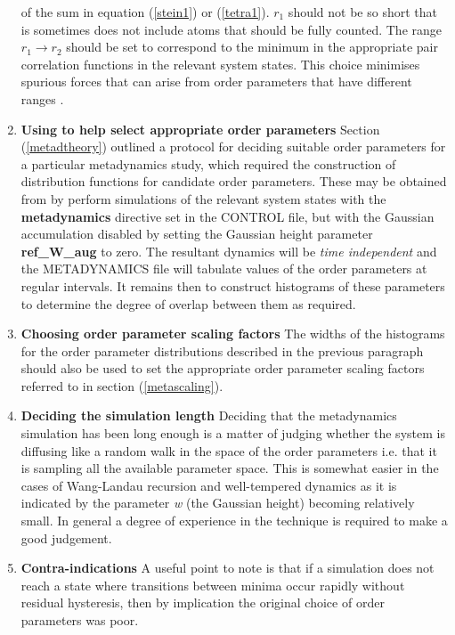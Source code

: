 \begin{enumerate}
  of the sum in equation (\ref{stein1}) or (\ref{tetra1}). $r_{1}$ should not
  be so short that is sometimes does not include atoms that should be fully
  counted. The range $r_{1}\rightarrow r_{2}$ should be set to correspond 
  to the minimum in the appropriate pair correlation functions in the relevant
  system states. This choice minimises spurious forces that can arise from
  order parameters that have different ranges \cite{quigley-09a}.
\item {\bf Using \D{} to help select appropriate order parameters}\newline
  Section (\ref{metadtheory}) outlined a protocol for deciding suitable order
  parameters for a particular metadynamics study, which required the
  construction of distribution functions for candidate order parameters. These
  may be obtained from \D{} by perform simulations of the relevant system
  states with the {\bf metadynamics} directive set in the CONTROL file, but
  with the Gaussian accumulation disabled by setting the Gaussian height
  parameter {\bf ref\_W\_aug} to zero. The resultant dynamics
  will be {\em time independent} and the METADYNAMICS file will tabulate
  values of the order parameters at regular intervals. It remains then to
  construct histograms of these parameters to determine the degree of overlap
  between them as required.
\item {\bf Choosing order parameter scaling factors}\newline
  The widths of the histograms for the order parameter distributions
  described in the previous paragraph should also be used to set the 
  appropriate order parameter scaling factors referred to in section 
  (\ref{metascaling}).
\item {\bf Deciding the simulation length}\newline
  Deciding that the metadynamics simulation has been long enough
  is a matter of judging whether the system is diffusing like a random walk in
  the space of the order parameters i.e. that it is sampling all the
  available parameter space. This is somewhat easier in the cases of
  Wang-Landau recursion and well-tempered dynamics as it is indicated by the
  parameter {\em w} (the Gaussian height) becoming relatively small. In
  general a degree of experience in the technique is required to make a good
  judgement. 
\item {\bf Contra-indications}\newline
  A useful point to note is that if a simulation does not reach a state
  where transitions between minima occur rapidly without residual hysteresis,
  then by implication the original choice of order parameters was poor.
\end{enumerate}


